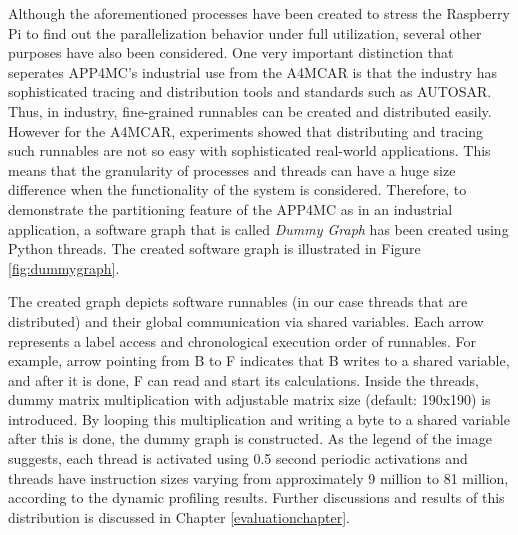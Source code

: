Although the aforementioned processes have been created to stress the Raspberry Pi to find out the parallelization behavior under full utilization, several other purposes have also been considered. One very important distinction that seperates APP4MC's industrial use from the A4MCAR is that the industry has sophisticated tracing and distribution tools and standards such as AUTOSAR. Thus, in industry, fine-grained runnables can be created and distributed easily. However for the A4MCAR, experiments showed that distributing and tracing such runnables are not so easy with sophisticated real-world applications. This means that the granularity of processes and threads can have a huge size difference when the functionality of the system is considered. Therefore, to demonstrate the partitioning feature of the APP4MC as in an industrial application, a software graph that is called \textit{Dummy Graph} has been created using Python threads. The created software graph is illustrated in Figure \ref{fig:dummygraph}.

The created graph depicts software runnables (in our case threads that are distributed) and their global communication via shared variables. Each arrow represents a label access and chronological execution order of runnables. For example, arrow pointing from B to F indicates that B writes to a shared variable, and after it is done, F can read and start its calculations. Inside the threads, dummy matrix multiplication with adjustable matrix size (default: 190x190) is introduced. By looping this multiplication and writing a byte to a shared variable after this is done, the dummy graph is constructed. As the legend of the image suggests, each thread is activated using 0.5 second periodic activations and threads have instruction sizes varying from approximately 9 million to 81 million, according to the dynamic profiling results. Further discussions and results of this distribution is discussed in Chapter \ref{evaluationchapter}.

